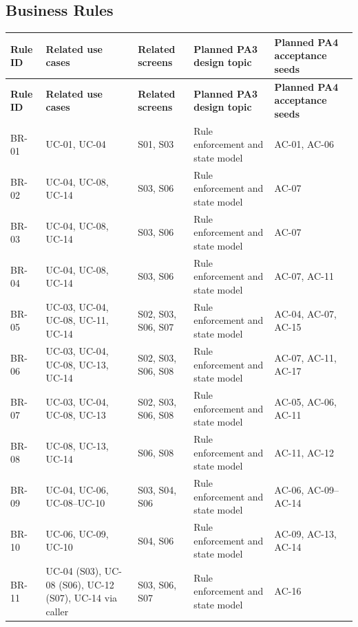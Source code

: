 \subsection{Business Rules}
\begingroup
\small
{}
\setlength{\tabcolsep}{3pt}
\renewcommand{\arraystretch}{1.1}
\begin{longtable}{|>{\raggedright\arraybackslash}p{}|>{\raggedright\arraybackslash}p{}|>{\raggedright\arraybackslash}p{}|>{\raggedright\arraybackslash}p{}|>{\raggedright\arraybackslash}p{}|}
\hline
\textbf{Rule ID} & \textbf{Related use cases} & \textbf{Related screens} & \textbf{Planned PA3 design topic} & \textbf{Planned PA4 acceptance seeds} \\ \hline
\endfirsthead
\hline
\textbf{Rule ID} & \textbf{Related use cases} & \textbf{Related screens} & \textbf{Planned PA3 design topic} & \textbf{Planned PA4 acceptance seeds} \\ \hline
\endhead
\hline
\endfoot
\hline
\endlastfoot
BR-01 & UC-01, UC-04 & S01, S03 & Rule enforcement and state model & AC-01, AC-06 \\ \hline
BR-02 & UC-04, UC-08, UC-14 & S03, S06 & Rule enforcement and state model & AC-07 \\ \hline
BR-03 & UC-04, UC-08, UC-14 & S03, S06 & Rule enforcement and state model & AC-07 \\ \hline
BR-04 & UC-04, UC-08, UC-14 & S03, S06 & Rule enforcement and state model & AC-07, AC-11 \\ \hline
BR-05 & UC-03, UC-04, UC-08, UC-11, UC-14 & S02, S03, S06, S07 & Rule enforcement and state model & AC-04, AC-07, AC-15 \\ \hline
BR-06 & UC-03, UC-04, UC-08, UC-13, UC-14 & S02, S03, S06, S08 & Rule enforcement and state model & AC-07, AC-11, AC-17 \\ \hline
BR-07 & UC-03, UC-04, UC-08, UC-13 & S02, S03, S06, S08 & Rule enforcement and state model & AC-05, AC-06, AC-11 \\ \hline
BR-08 & UC-08, UC-13, UC-14 & S06, S08 & Rule enforcement and state model & AC-11, AC-12 \\ \hline
BR-09 & UC-04, UC-06, UC-08--UC-10 & S03, S04, S06 & Rule enforcement and state model & AC-06, AC-09--AC-14 \\ \hline
BR-10 & UC-06, UC-09, UC-10 & S04, S06 & Rule enforcement and state model & AC-09, AC-13, AC-14 \\ \hline
BR-11 & UC-04 (S03), UC-08 (S06), UC-12 (S07), UC-14 via caller & S03, S06, S07 & Rule enforcement and state model & AC-16 \\ \hline

\end{longtable}
